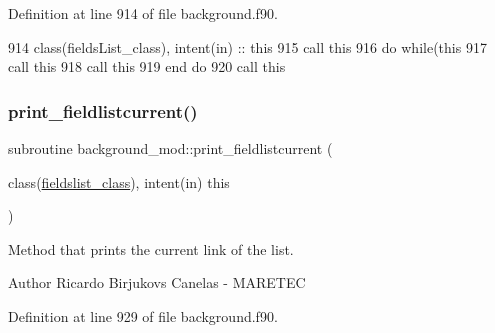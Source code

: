 Definition at line 914 of file background.\+f90.


\begin{DoxyCode}
914     \textcolor{keywordtype}{class}(fieldsList\_class), \textcolor{keywordtype}{intent(in)} :: this
915     \textcolor{keyword}{call }this%
916     \textcolor{keywordflow}{do} \textcolor{keywordflow}{while}(this%
917         \textcolor{keyword}{call }this%
918         \textcolor{keyword}{call }this%
919 \textcolor{keywordflow}{    end do}
920     \textcolor{keyword}{call }this%
\end{DoxyCode}
\mbox{\label{namespacebackground__mod_a2bd18f3830c0667741efd086d36753db}} 
\subsubsection{\texorpdfstring{print\+\_\+fieldlistcurrent()}{print\_fieldlistcurrent()}}
{\footnotesize\ttfamily subroutine background\+\_\+mod\+::print\+\_\+fieldlistcurrent (\begin{DoxyParamCaption}\item[{class(\mbox{\hyperlink{structbackground__mod_1_1fieldslist__class}{fieldslist\+\_\+class}}), intent(in)}]{this }\end{DoxyParamCaption})\hspace{0.3cm}{\ttfamily [private]}}



Method that prints the current link of the list. 

\begin{DoxyAuthor}{Author}
Ricardo Birjukovs Canelas -\/ M\+A\+R\+E\+T\+EC 
\end{DoxyAuthor}


Definition at line 929 of file background.\+f90.


